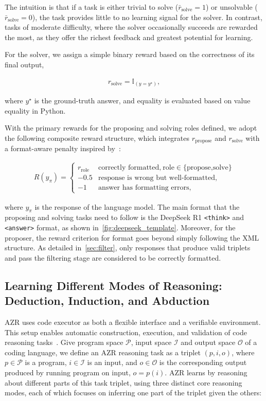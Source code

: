 \documentclass{article}
\begin{document}
The intuition is that if a task is either trivial to solve (\(\bar{r}_{\text{solve}} = 1\)) or unsolvable (\(\bar{r}_{\text{solve}} = 0\)), the task provides little to no learning signal for the solver. In contrast, tasks of moderate difficulty, where the solver occasionally succeeds are rewarded the most, as they offer the richest feedback and greatest potential for learning.

For the solver, we assign a simple binary reward based on the correctness of its final output,

\begin{align}
r_\text{solve}=\mathbb{I}_{(y=y^\star)},
\label{eq:solver_reward}
\end{align}

where \(y^\star\) is the ground-truth answer, and equality is evaluated based on value equality in Python.

With the primary rewards for the proposing and solving roles defined, we adopt the following composite reward structure, which integrates \(r_\text{propose}\) and \(r_\text{solve}\) with a format-aware penalty inspired by~\citet{guo2025deepseek}:

\begin{align}
    R(y_\pi) =
    \begin{cases}
    r_\text{role} & \text{correctly formatted,}~\text{role}\in\{\text{propose,solve}\} \\
    -0.5 & \text{response is wrong but well-formatted,} \\
    -1 & \text{answer has formatting errors,}
    \end{cases}
\label{eq:azr_reward}
\end{align}

where \(y_\pi\) is the response of the language model. The main format that the proposing and solving tasks need to follow is the DeepSeek R1 \texttt{<think>} and \texttt{<answer>} format, as shown in~\cref{fig:deepseek_template}. Moreover, for the proposer, the reward criterion for format goes beyond simply following the XML structure. As detailed in~\cref{sec:filter}, only responses that produce valid triplets and pass the filtering stage are considered to be correctly formatted.


\subsection{Learning Different Modes of Reasoning: Deduction, Induction, and Abduction}
\label{sec:task_type}
AZR uses code executor as both a flexible interface and a verifiable environment. This setup enables automatic construction, execution, and validation of code reasoning tasks~\citep{stuart2013understanding, aryabumi2024code}. Give program space \(\mathscr{P}\), input space \(\mathscr{I}\) and output space \(\mathscr{O}\) of a coding language, we define an AZR reasoning task as a triplet \((p, i, o)\), where \(p \in \mathscr{P}\) is a program, \(i \in \mathscr{I}\) is an input, and \(o \in \mathscr{O}\) is the corresponding output produced by running program on input, \(o=p(i)\). AZR learns by reasoning about different parts of this task triplet, using three distinct core reasoning modes, each of which focuses on inferring one part of the triplet given the others:
\end{document}
